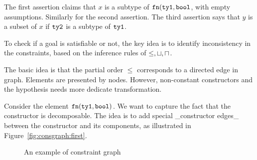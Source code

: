 The first assertion claims that $x$ is a subtype of $\mathtt{fn} (\mathtt{ty1},
\mathtt{bool}$, with empty assumptions. Similarly for the second assertion. The
third assertion says that $y$ is a subset of $x$ if $\mathtt{ty2}$ is a subtype of
$\mathtt{ty1}$.

To check if a goal is satisfiable or not, the key idea is to identify
inconsistency in the constraints, based on the inference rules of $\leq, \sqcup,
\sqcap$.

The basic idea is that the partial order $\leq$ corresponds to a directed edge
in graph. Elements are presented by nodes. However, non-constant constructors
and the hypothesis needs more dedicate transformation.

Consider the element $\mathtt{fn} (\mathtt{ty1}, \mathtt{bool})$. We want to capture the fact
that the constructor is decomposable. The idea is to add special _constructor
edges_ between the constructor and its components, as illustrated in
Figure~\ref{fig:consgraph:first}.

\begin{figure}
\begin{center}
%
%
\end{center}
\caption{An example of constraint graph}
\label{fig:consgraph}
\end{figure}

